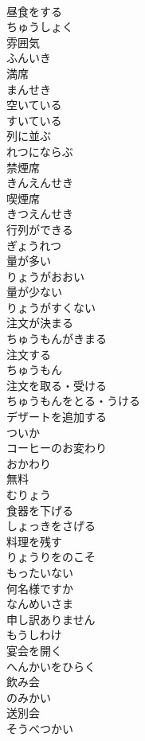 \documentclass[8pt]{extreport}
\begin{document}
\begin{CJK}{UTF8}{min}
\\	昼食をする	
\\	ちゅうしょく
\\	雰囲気	
\\	ふんいき
\\	満席	
\\	まんせき
\\	空いている	
\\	すいている
\\	列に並ぶ	
\\	れつにならぶ
\\	禁煙席	
\\	きんえんせき
\\	喫煙席	
\\	きつえんせき
\\	行列ができる	
\\	ぎょうれつ
\\	量が多い	
\\	りょうがおおい
\\	量が少ない	
\\	りょうがすくない
\\	注文が決まる	
\\	ちゅうもんがきまる
\\	注文する	
\\	ちゅうもん
\\	注文を取る・受ける	
\\	ちゅうもんをとる・うける
\\	デザートを追加する	
\\	ついか
\\	コーヒーのお変わり	
\\	おかわり
\\	無料	
\\	むりょう
\\	食器を下げる	
\\	しょっきをさげる
\\	料理を残す	
\\	りょうりをのこそ
\\	もったいない	
\\	何名様ですか	
\\	なんめいさま
\\	申し訳ありません	
\\	もうしわけ
\\	宴会を開く	
\\	へんかいをひらく
\\	飲み会	
\\	のみかい
\\	送別会	
\\	そうべつかい

\end{CJK}
\end{document}
